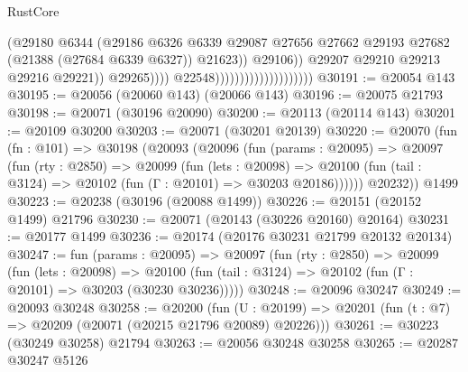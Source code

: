 \begin{lexlean}{RustCore}
\begin{coremodule}
                                                            (@29180
                                                              @6344
                                                              (@29186
                                                                @6326
                                                                @6339
                                                                @29087
                                                                @27656
                                                                @27662
                                                                @29193
                                                                @27682
                                                                (@21388 (@27684 @6339 @6327))
                                                                @21623))
                                                            @29106))
                                                        @29207
                                                        @29210
                                                        @29213
                                                        @29216
                                                        @29221))
                                                    @29265))))
                                            @22548))))))))))))))))))))
@30191 := @20054 @143
@30195 := @20056 (@20060 @143) (@20066 @143)
@30196 := @20075 @21793
@30198 := @20071 (@30196 @20090)
@30200 := @20113 (@20114 @143)
@30201 := @20109 @30200
@30203 := @20071 (@30201 @20139)
@30220 := @20070
    (fun (fn : @101) =>
    @30198
      (@20093
        (@20096
          (fun (params : @20095) =>
          @20097
            (fun (rty : @2850) =>
            @20099
              (fun (lets : @20098) =>
              @20100 (fun (tail : @3124) => @20102 (fun (Γ : @20101) => @30203 @20186))))))
        @20232))
    @1499
@30223 := @20238 (@30196 (@20088 @1499))
@30226 := @20151 (@20152 @1499) @21796
@30230 := @20071 (@20143 (@30226 @20160) @20164)
@30231 := @20177 @1499
@30236 := @20174 (@20176 @30231 @21799 @20132 @20134)
@30247 := fun (params : @20095) =>
  @20097
    (fun (rty : @2850) =>
    @20099
      (fun (lets : @20098) =>
      @20100 (fun (tail : @3124) => @20102 (fun (Γ : @20101) => @30203 (@30230 @30236)))))
@30248 := @20096 @30247
@30249 := @20093 @30248
@30258 := @20200
    (fun (U : @20199) => @20201 (fun (t : @7) => @20209 (@20071 (@20215 @21796 @20089) @20226)))
@30261 := @30223 (@30249 @30258) @21794
@30263 := @20056 @30248 @30258
@30265 := @20287 @30247 @5126

\end{coremodule}
\end{lexlean}
